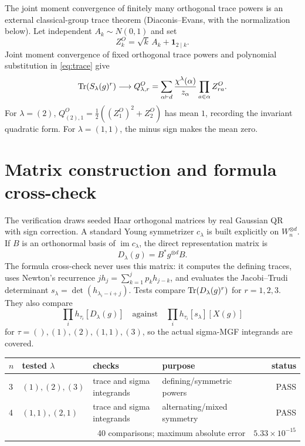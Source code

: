 \documentclass[11pt]{article}
\begin{document}
The joint moment convergence of finitely many orthogonal trace powers is an
external classical-group trace theorem (Diaconis--Evans, with the
normalization below).  Let independent $A_k\sim N(0,1)$ and set
\begin{equation}
 Z_k^O=\sqrt{k}\,A_k+\mathbf1_{2\mid k}.
\end{equation}
Joint moment convergence of fixed orthogonal trace powers and polynomial substitution in \eqref{eq:trace} give
\begin{equation}
 \operatorname{Tr}(S_\lambda(g)^r)\longrightarrow Q^O_{\lambda,r}
 =\sum_{\alpha\vdash d}\frac{\chi^\lambda(\alpha)}{z_\alpha}\prod_{a\in\alpha}Z_{ra}^O.
\end{equation}
For $\lambda=(2)$, $Q^O_{(2),1}=\tfrac12((Z_1^O)^2+Z_2^O)$ has mean $1$, recording the invariant quadratic form. For $\lambda=(1,1)$, the minus sign makes the mean zero.

\section{Matrix construction and formula cross-check}
The verification draws seeded Haar orthogonal matrices by real Gaussian QR with sign correction. A standard Young symmetrizer $c_\lambda$ is built explicitly on $W_n^{\otimes d}$. If $B$ is an orthonormal basis of $\operatorname{im}c_\lambda$, the direct representation matrix is
\begin{equation}
 D_\lambda(g)=B^*g^{\otimes d}B.
\end{equation}
The formula cross-check never uses this matrix: it computes the defining traces, uses Newton's recurrence $jh_j=\sum_{k=1}^jp_kh_{j-k}$, and evaluates the Jacobi--Trudi determinant $s_\lambda=\det(h_{\lambda_i-i+j})$. Tests compare $\operatorname{Tr}(D_\lambda(g)^r)$ for $r=1,2,3$. They also compare
\begin{equation}
 \prod_i h_{\tau_i}[D_\lambda(g)]
 \quad\text{against}\quad
 \prod_i h_{\tau_i}[s_\lambda][X(g)]
\end{equation}
for $\tau=(),(1),(2),(1,1),(3)$, so the actual sigma-MGF integrands are covered.

\begin{center}\begin{tabular}{@{}llllr@{}}\toprule
$n$ & tested $\lambda$ & checks & purpose & status\\\midrule
3 & $(1),(2),(3)$ & trace and sigma integrands & defining/symmetric powers & PASS\\
4 & $(1,1),(2,1)$ & trace and sigma integrands & alternating/mixed symmetry & PASS\\\midrule
\multicolumn{4}{r}{40 comparisons; maximum absolute error} & $5.33\times10^{-15}$\\\bottomrule
\end{tabular}\end{center}
\end{document}
